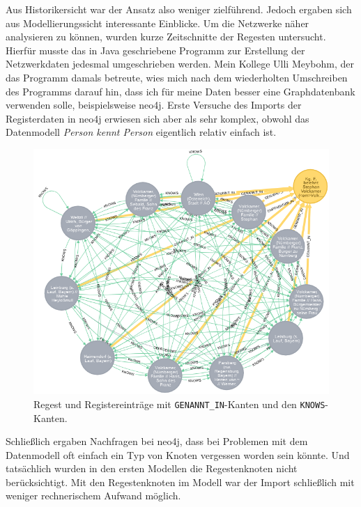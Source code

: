 \documentclass[ngerman,]{scrreprt}
\begin{document}
Aus Historikersicht war der Ansatz also weniger zielführend. Jedoch ergaben sich aus Modellierungssicht interessante Einblicke. Um die Netzwerke näher analysieren zu können, wurden kurze Zeitschnitte der Regesten untersucht. Hierfür musste das in Java geschriebene Programm zur Erstellung der Netzwerkdaten jedesmal umgeschrieben werden. Mein Kollege Ulli Meybohm, der das Programm damals betreute, wies mich nach dem wiederholten Umschreiben des Programms darauf hin, dass ich für meine Daten besser eine Graphdatenbank verwenden solle, beispielsweise neo4j. Erste Versuche des Imports der Registerdaten in neo4j erwiesen sich aber als sehr komplex, obwohl das Datenmodell \emph{Person kennt Person} eigentlich relativ einfach ist.

\begin{figure}
\centering
\includegraphics{Bilder/1zu1-Beziehungen-Register-Regest.png}
\caption{Regest und Registereinträge mit \texttt{GENANNT\_IN}-Kanten und den \texttt{KNOWS}-Kanten.}
\end{figure}

Schließlich ergaben Nachfragen bei neo4j, dass bei Problemen mit dem Datenmodell oft einfach ein Typ von Knoten vergessen worden sein könnte. Und tatsächlich wurden in den ersten Modellen die Regestenknoten nicht berücksichtigt. Mit den Regestenknoten im Modell war der Import schließlich mit weniger rechnerischem Aufwand möglich.
\end{document}
